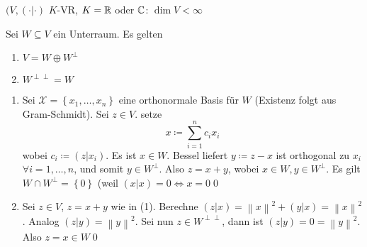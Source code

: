 $ (V, ( \cdot | \cdot ) $ $ K $-VR, $ K = \mathbb{R}  $ oder $ \mathbb{C}  $: $ \dim V < \infty $
\setcounter{subenvironmentnumber}{6}
\begin{subtheorem}
	Sei $ W \subseteq V $ ein Unterraum.
	Es gelten
	\begin{enumerate}[label=(\arabic*)]
		\item $ V = W \oplus W^{\perp}  $ 
		\item $ W^{\perp\perp} = W $
	\end{enumerate}
\end{subtheorem}
\begin{subproof*}
	\begin{enumerate}[label=(\arabic*)]
		\item Sei $ \mathcal{X}  = \left\{ x_1, \dotsc, x_n \right\}  $ eine orthonormale Basis für $ W $ (Existenz folgt aus Gram-Schmidt).
			Sei $ z \in V $.
			setze
			\[
				x \coloneqq \sum_{i=1}^{n} c_i x_i
			\]
			wobei $ c_i \coloneqq (z | x_i) $.
			Es ist $ x \in W $.
			Bessel liefert $ y \coloneqq z - x $ ist orthogonal zu $ x_i $ $ \forall i = 1, \dotsc, n $, und somit $ y \in W^{\perp}  $.
			Also $ z = x + y $, wobei $ x \in W, y \in W^{\perp}  $.
			Es gilt $ W \cap W^{\perp} = \left\{ 0 \right\}  $ (weil $ (x|x) = 0 \iff x = 0  $\qed
		\item Sei $ z \in V $, $ z = x + y $ wie in (1).
			Berechne $ (z | x) = \left\| x \right\| ^2 + (y|x) = \left\| x \right\| ^2 $.
			Analog $ (z|y) = \left\| y \right\| ^2 $.
			Sei nun $ z \in W^{\perp\perp}  $, dann ist $ (z|y) = 0 = \left\| y \right\|^2  $.
			Also $ z = x \in W $\qed
	\end{enumerate}
\end{subproof*}

\setcounter{subsubsection}{15}
